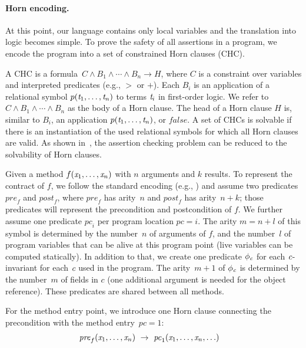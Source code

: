 \paragraph{Horn encoding.}
At this point, our language contains only local variables and the 
translation into logic becomes simple. To prove the safety of all 
assertions in a program, we encode
the program into a set of constrained Horn clauses (CHC).

A CHC is a formula~$C \wedge B_1 \wedge
\cdots \wedge B_n \to H$, where $C$ is a constraint over variables
and interpreted predicates (e.g.,  $>$ or $+$). Each $B_i$ is an
application of a relational symbol $p(\textit{t}_1, \ldots, \textit{t}_n)$ to
terms $\textit{t}_i$ in first-order logic. We refer to $C \wedge B_1 \wedge
\cdots \wedge B_n$ as the body of a Horn clause. The
head of a Horn clause $H$ is, similar to $B_i$, an application
$p(\textit{t}_1, \ldots, \textit{t}_n)$, or $\mathit{false}$.
A set of CHCs is solvable if there is an instantiation
of the used relational symbols for which all Horn clauses are valid.
As shown in~\cite{verificationAsSMT}, the assertion checking problem
can be reduced to the solvability of Horn clauses.

Given a method $f(\textit{x}_1, \ldots, \textit{x}_n)$ with $n$ arguments and
$k$ results. To represent the contract of $f$, we
follow the standard encoding (e.g., \cite{GrebenshchikovLPR12})
and assume two predicates $\mathit{pre}_f$ and $\mathit{post}_f$,
where $\mathit{pre}_f$ has arity~$n$ and $\mathit{post}_f$ has
arity~$n+k$; those predicates will represent the precondition and
postcondition of $f$.
We further assume one predicate $\mathit{pc}_i$ per program location
$\mathit{pc}=i$. The arity $m = n + l$ of this symbol is determined by
the number~$n$ of arguments of $f$, and the number~$l$ of program
variables that can be alive at this program point (live variables can
be computed statically). In addition to that, we create one predicate
$\phi_\textit{c}$ for each $\textit{c}$-invariant for each $\textit{c}$ used in the
program. The arity~$m+1$ of $\phi_\textit{c}$ is determined by the
number~$m$ of fields in $c$ (one additional argument is needed for the
object reference). These predicates are shared between all methods.

For the method entry point, we introduce one Horn clause connecting
the precondition with the method entry~$\mathit{pc} = 1$:
\begin{align*}
  \mathit{pre}_f(\lvar_1, \ldots, \lvar_n) & ~\to~
  \mathit{pc}_1(\lvar_1,\ldots, \lvar_n, \ldots)%
\end{align*}


